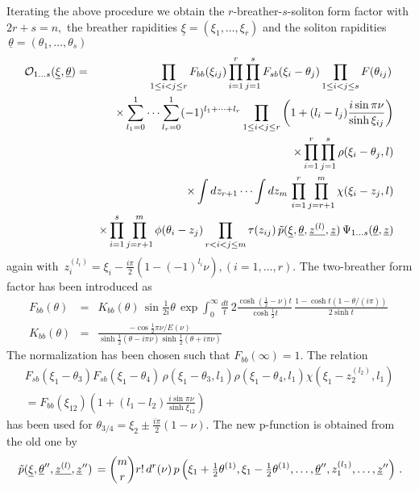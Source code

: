 \documentclass[a4paper,a4paper]{article}
\begin{document}
Iterating the above procedure we obtain the $r$-breather-$s$-soliton form
factor with $2r+s=n,$ the breather rapidities $\underline{\xi }=(\xi
_{1},\dots ,\xi _{r})$ and the soliton rapidities$\,\underline{\theta }%
=(\theta _{1},\dots ,\theta _{s})$ 
\begin{eqnarray*}
\mathcal{O}_{1\dots s}(\underline{\xi },\underline{\theta }) &=&\prod_{1\leq
i<j\leq r}F_{bb}(\xi _{ij})\prod_{i=1}^{r}\prod_{j=1}^{s}F_{sb}(\xi
_{i}-\theta _{j})\prod_{1\leq i<j\leq s}F(\theta _{ij})\, \\
&&\times \sum_{l_{1}=0}^{1}\dots \sum_{l_{r}=0}^{1}(-1)^{l_{1}+\dots
+l_{r}}\prod_{1\leq i<j\leq r}\left( 1+(l_{i}-l_{j})\frac{i\sin \pi \nu }{%
\sinh \xi _{ij}}\right) \\
&&\times \prod_{i=1}^{r}\prod_{j=1}^{s}\rho (\xi _{i}-\theta _{j},l) \\
&&\times \int dz_{r+1}\cdots \int
dz_{m}\,\prod_{i=1}^{r}\prod_{j=r+1}^{m}\chi (\xi _{i}-z_{j},l) \\
&&\times \prod_{i=1}^{s}\prod_{j=r+1}^{m}\phi (\theta
_{i}-z_{j})\prod_{r<i<j\leq m}\tau (z_{ij})\,\tilde{p}(\underline{\xi },%
\underline{\theta },\underline{z^{(l)}},{\underline{z}})\,\Psi _{1\dots s}(%
\underline{\theta },{\underline{z}})
\end{eqnarray*}
again with $\,z_{i}^{(l_{i})}=\xi _{i}-\frac{i\pi }{2}(1-(-1)^{l_{i}}\nu
),(i=1,\dots ,r)$. The two-breather form factor has been introduced as 
\begin{eqnarray*}
F_{bb}(\theta ) &=&K_{bb}(\theta )\,\sin \tfrac{1}{2i}\theta \,\exp
\int_{0}^{\infty }\frac{dt}{t}\,2\frac{\cosh (\frac{1}{2}-\nu )t}{\cosh 
\frac{1}{2}t}\,\frac{1-\cosh t(1-\theta /(i\pi ))}{2\sinh t}\, \\
K_{bb}(\theta ) &=&\frac{-\cos \frac{1}{2}\pi \nu /E(\nu )}{\sinh \frac{1}{2}%
(\theta -i\pi \nu )\sinh \frac{1}{2}(\theta +i\pi \nu )}
\end{eqnarray*}
The normalization has been chosen such that $F_{bb}(\infty )=1$. The
relation 
\begin{multline*}
F_{sb}(\xi _{1}-\theta _{3})F_{sb}(\xi _{1}-\theta _{4})\,\rho (\xi
_{1}-\theta _{3},l_{1})\rho (\xi _{1}-\theta _{4},l_{1})\chi (\xi
_{1}-z_{2}^{(l_{2})},l_{1}) \\
=F_{bb}(\xi _{12})\left( 1+(l_{1}-l_{2})\frac{i\sin \pi \nu }{\sinh \xi _{12}%
}\right)
\end{multline*}
has been used for $\theta _{3/4}=\xi _{2}\pm \frac{i\pi }{2}(1-\nu )$. The
new p-function is obtained from the old one by 
\[
\,\tilde{p}(\underline{\xi },\underline{\theta }^{\prime \prime },\underline{%
z^{(l)}},{\underline{z}}^{\prime \prime })\,=\binom{m}{r}r!\,d^{r}(\nu
)\,p\left( \xi _{1}+\tfrac{1}{2}\theta ^{(1)},\xi _{1}-\tfrac{1}{2}\theta
^{(1)},\dots ,\underline{\theta }^{\prime \prime },z_{1}^{(l_{1})},\dots ,{%
\underline{z}}^{\prime \prime }\right) \,. 
\]
\end{document}
